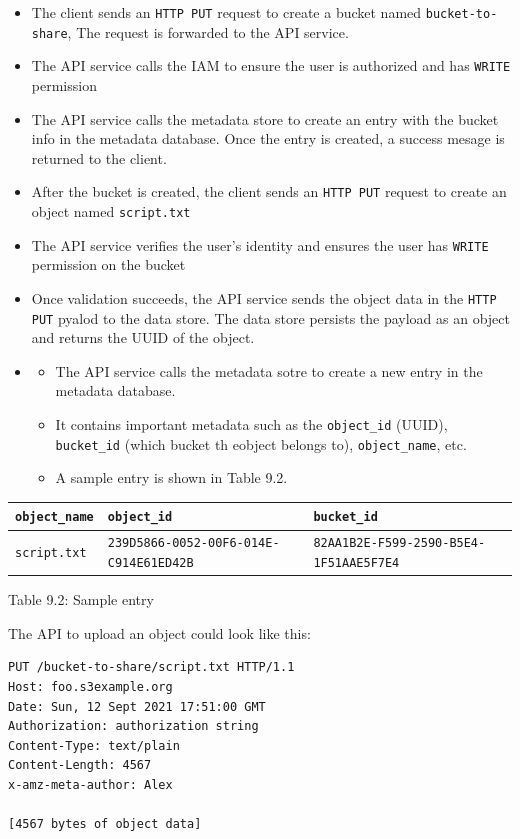 \documentclass{report}
\theoremstyle{definition}
\begin{document}
\begin{itemize}
\item
The client sends an \lstinline|HTTP PUT| request to create a bucket named \lstinline|bucket-to-share|, The request is forwarded to the API service.
\item
The API service calls the IAM to ensure the user is authorized and has \lstinline|WRITE| permission
\item
The API service calls the metadata store to create an entry with the bucket info in the metadata database. Once the entry is created, a success mesage is returned to the client.
\item
After the bucket is created, the client sends an \lstinline|HTTP PUT| request to create an object named \lstinline|script.txt|
\item
The API service verifies the user's identity and ensures the user has \lstinline|WRITE| permission on the bucket
\item
Once validation succeeds, the API service sends the object data in the \lstinline|HTTP PUT| pyalod to the data store. The data store persists the payload as an object and returns the UUID of the object.
\item

\begin{itemize}
\item
The API service calls the metadata sotre to create a new entry in the metadata database.
\item
 It contains important metadata such as the \lstinline|object_id| (UUID), \lstinline|bucket_id| (which bucket th eobject belongs to), \lstinline|object_name|, etc.
\item
A sample entry is shown in Table 9.2.
\end{itemize}
\end{itemize}

\begin{tabular}{|p{4cm}|p{4cm}|p{4cm}|}
\hline
\lstinline|object_name| & \lstinline|object_id| & \lstinline|bucket_id| \\
\hline
\lstinline|script.txt| & \lstinline|239D5866-0052-00F6-014E-C914E61ED42B| & \lstinline|82AA1B2E-F599-2590-B5E4-1F51AAE5F7E4| \\
\hline
\end{tabular}

Table 9.2: Sample entry

The API to upload an object could look like this:

\begin{lstlisting}[caption={Uploading an object}, label={lst:uploading-object}]
PUT /bucket-to-share/script.txt HTTP/1.1
Host: foo.s3example.org
Date: Sun, 12 Sept 2021 17:51:00 GMT
Authorization: authorization string
Content-Type: text/plain
Content-Length: 4567
x-amz-meta-author: Alex

[4567 bytes of object data]
\end{lstlisting}
\end{document}
